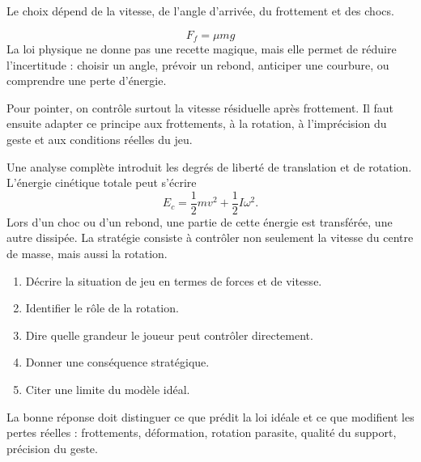 \documentclass[11pt,a4paper]{article}
\begin{document}
\begin{exemplebox}[Observation]
Le choix dépend de la vitesse, de l'angle d'arrivée, du frottement et des chocs.
\end{exemplebox}

\begin{theorembox}
\[
F_f=\mu mg
\]
La loi physique ne donne pas une recette magique, mais elle permet de réduire l'incertitude : choisir un angle, prévoir un rebond, anticiper une courbure, ou comprendre une perte d'énergie.
\end{theorembox}

\begin{methodebox}
Pour pointer, on contrôle surtout la vitesse résiduelle après frottement.
Il faut ensuite adapter ce principe aux frottements, à la rotation, à l'imprécision du geste et aux conditions réelles du jeu.
\end{methodebox}

\begin{approfondissementbox}
Une analyse complète introduit les degrés de liberté de translation et de rotation. L'énergie cinétique totale peut s'écrire
\[
E_c=\frac12mv^2+\frac12I\omega^2.
\]
Lors d'un choc ou d'un rebond, une partie de cette énergie est transférée, une autre dissipée. La stratégie consiste à contrôler non seulement la vitesse du centre de masse, mais aussi la rotation.
\end{approfondissementbox}

\begin{exercicebox}
\begin{enumerate}
  \item Décrire la situation de jeu en termes de forces et de vitesse.
  \item Identifier le rôle de la rotation.
  \item Dire quelle grandeur le joueur peut contrôler directement.
  \item Donner une conséquence stratégique.
  \item Citer une limite du modèle idéal.
\end{enumerate}
\end{exercicebox}

\begin{corrigebox}[Indication]
La bonne réponse doit distinguer ce que prédit la loi idéale et ce que modifient les pertes réelles : frottements, déformation, rotation parasite, qualité du support, précision du geste.
\end{corrigebox}
\end{document}
